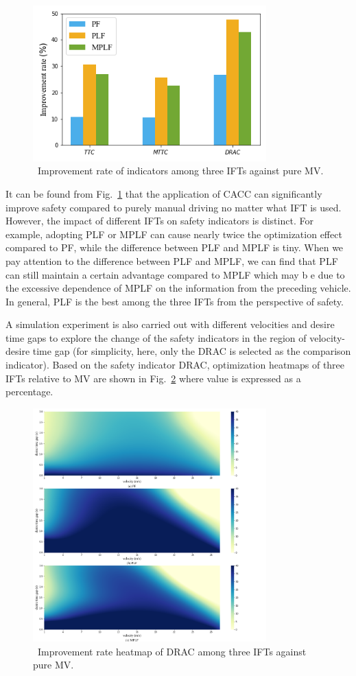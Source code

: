 \documentclass[journal]{IEEEtran}
\begin{document}
\begin{figure}
\includegraphics[width=9cm]{fig8.png}
\caption{~Improvement rate of indicators among three IFTs against pure MV.} 
\label{Figure8}
\end{figure}

It can be found from Fig.~\ref{Figure8} that the application of CACC can significantly improve safety compared to purely manual driving no matter what IFT is used. However, the impact of different IFTs on safety indicators is distinct. For example, adopting PLF or MPLF can cause nearly twice the optimization effect compared to PF, while the difference between PLF and MPLF is tiny. When we pay attention to the difference between PLF and MPLF, we can find that PLF can still maintain a certain advantage compared to MPLF which may b e due to the excessive dependence of MPLF on the information from the preceding vehicle. In general, PLF is the best among the three IFTs from the perspective of safety.


A simulation experiment is also carried out with different velocities and desire time gaps to explore the change of the safety indicators in the region of velocity-desire time gap (for simplicity, here, only the DRAC is selected as the comparison indicator). Based on the safety indicator DRAC, optimization heatmaps of three IFTs relative to MV are shown in Fig.~\ref{Figure9} where value is expressed as a percentage.

\begin{figure}
\includegraphics[width=9cm]{fig9.png}
\caption{~Improvement rate heatmap of DRAC among three IFTs against pure MV.} 
\label{Figure9}
\end{figure}
\end{document}
